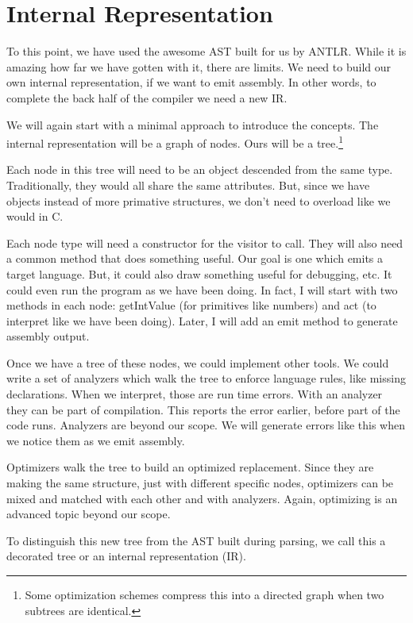 \chapter{Internal Representation}

To this point, we have used the awesome AST built for us by ANTLR.
While it is amazing how far we have gotten with it, there are limits.
We need to build our own internal representation, if we want to
emit assembly. In other words, to complete the back half of the
compiler we need a new IR.

We will again start with a minimal approach to introduce the concepts.
The internal representation will be a graph of nodes. Ours will
be a tree.\footnote{Some optimization schemes compress this into
a directed graph when two subtrees are identical.}

Each node in this tree will need to be an object descended from the same type.
Traditionally, they would all share the same attributes. But, since
we have objects instead of more primative structures, we don't need to
overload like we would in C.

Each node type will need a constructor for the visitor to call.
They will also need a common method that does something useful.
Our goal is one which emits a target language. But, it could also
draw something useful for debugging, etc. It could even run the
program as we have been doing. In fact, I will start with two
methods in each node: getIntValue (for primitives like
numbers) and act (to interpret like we have been doing). Later,
I will add an emit method to generate assembly output.

Once we have a tree of these nodes, we could implement other tools.
We could write a set of analyzers which walk the tree to enforce
language rules, like missing declarations. When we interpret, those
are run time errors. With an analyzer they can be part of
compilation. This reports the error earlier, before part
of the code runs. Analyzers are beyond our scope. We will generate
errors like this when we notice them as we emit assembly.

Optimizers walk the tree to build an optimized replacement. Since
they are making the same structure, just with different specific
nodes, optimizers can be mixed and matched with each other and
with analyzers. Again, optimizing is an advanced topic beyond our scope.

To distinguish this new tree from the AST built during parsing,
we call this a decorated tree or an internal representation (IR).

